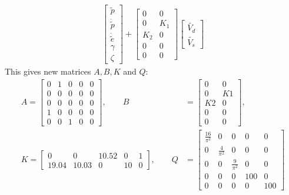 \begin{align*}
\begin{bmatrix}
    \tilde{p}\\
    \dot{\tilde{p}}\\
    \dot{\tilde{e}}\\
    \gamma\\
    \zeta
\end{bmatrix} + 
\begin{bmatrix}
    0 & 0\\
    0 & K_1\\
    K_2 & 0\\
    0 & 0\\
    0 & 0
\end{bmatrix}
\begin{bmatrix}
    \tilde{V_d}\\
    \tilde{V_s}
\end{bmatrix}
\end{align*}
This gives new matrices $A, B, K$ and $Q$:
\begin{align*}
A = \begin{bmatrix}
    0 & 1 & 0 & 0 & 0\\
    0 & 0 & 0 & 0 & 0\\
    0 & 0 & 0 & 0 & 0\\
    1 & 0 & 0 & 0 & 0\\
    0 & 0 & 1 & 0 & 0
\end{bmatrix},\qquad
B &= \begin{bmatrix}
    0 & 0\\
    0 & K1\\
    K2 & 0\\
    0 & 0\\
    0 & 0
\end{bmatrix},\\
K = \begin{bmatrix}
0       & 0     & 10.52 & 0     & 1\\
19.04   & 10.03 & 0     & 10    & 0 
\end{bmatrix}, \qquad
Q &= \begin{bmatrix}
    \frac{16}{\pi^2} & 0 & 0 & 0 & 0\\
    0 & \frac{4}{\pi^2} & 0 & 0 & 0\\
    0 & 0 & \frac{9}{\pi^2} & 0 & 0 \\
    0 & 0 & 0 & 100 & 0 \\
    0 & 0 & 0 & 0 & 100
\end{bmatrix}
\end{align*}